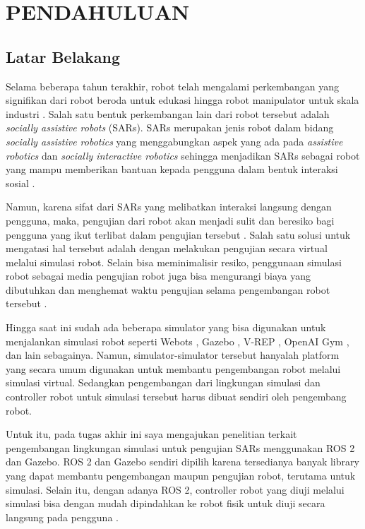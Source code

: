 \section{PENDAHULUAN}

\subsection{Latar Belakang}

Selama beberapa tahun terakhir, robot telah mengalami perkembangan yang signifikan dari robot beroda untuk edukasi \citep{Goncalves2009} hingga robot manipulator untuk skala industri \citep{Blatnicky2020}.
Salah satu bentuk perkembangan lain dari robot tersebut adalah \emph{socially assistive robots} (SARs).
SARs merupakan jenis robot dalam bidang \emph{socially assistive robotics} yang menggabungkan aspek yang ada pada \emph{assistive robotics} dan \emph{socially interactive robotics} sehingga menjadikan SARs sebagai robot yang mampu memberikan bantuan kepada pengguna dalam bentuk interaksi sosial \citep{Seifer2005}.

Namun, karena sifat dari SARs yang melibatkan interaksi langsung dengan pengguna, maka, pengujian dari robot akan menjadi sulit dan beresiko bagi pengguna yang ikut terlibat dalam pengujian tersebut \citep{Erickson2020}.
Salah satu solusi untuk mengatasi hal tersebut adalah dengan melakukan pengujian secara virtual melalui simulasi robot.
Selain bisa meminimalisir resiko, penggunaan simulasi robot sebagai media pengujian robot juga bisa mengurangi biaya yang dibutuhkan dan menghemat waktu pengujian selama pengembangan robot tersebut \citep{Takaya2016}.

Hingga saat ini sudah ada beberapa simulator yang bisa digunakan untuk menjalankan simulasi robot seperti Webots \citep{Michel2004}, Gazebo \citep{Koenig2004}, V-REP \citep{Rohmer2013}, OpenAI Gym \citep{Brockman2016}, dan lain sebagainya.
Namun, simulator-simulator tersebut hanyalah platform yang secara umum digunakan untuk membantu pengembangan robot melalui simulasi virtual.
Sedangkan pengembangan dari lingkungan simulasi dan controller robot untuk simulasi tersebut harus dibuat sendiri oleh pengembang robot.

Untuk itu, pada tugas akhir ini saya mengajukan penelitian terkait pengembangan lingkungan simulasi untuk pengujian SARs menggunakan ROS 2 dan Gazebo.
ROS 2 dan Gazebo sendiri dipilih karena tersedianya banyak library yang dapat membantu pengembangan maupun pengujian robot, terutama untuk simulasi.
Selain itu, dengan adanya ROS 2, controller robot yang diuji melalui simulasi bisa dengan mudah dipindahkan ke robot fisik untuk diuji secara langsung pada pengguna \citep{Takaya2016}.

